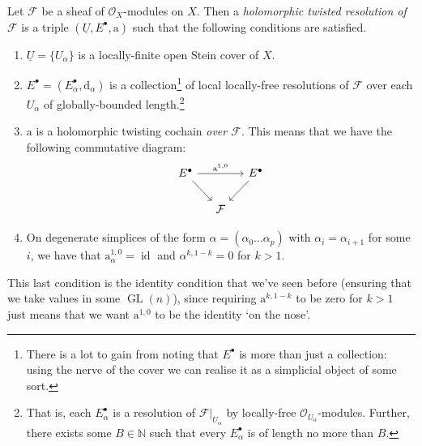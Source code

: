 \documentclass[11pt,notitlepage]{article}
\numberwithin{equation}{subsection}
\DeclareMathOperator{\GL}{GL}
\DeclareMathOperator{\id}{id}
\renewcommand{\d}{\mathrm{d}}
\begin{document}
                \begin{definition}
                    Let $\mathcal{F}$ be a sheaf of $\mathcal{O}_X$-modules on $X$.
                    Then a \textit{holomorphic twisted resolution of $\mathcal{F}$} is a triple $(\underline{U},E^\bullet,\mathrm{a})$ such that the following conditions are satisfied.
                    \begin{enumerate}
                        \item $\underline{U}=\{U_\alpha\}$ is a locally-finite open Stein cover of $X$.
                        \item $E^\bullet=(E^\bullet_\alpha,\d_\alpha)$ is a collection\footnote{There is a lot to gain from noting that $E^\bullet$ is more than just a collection: using the nerve of the cover we can realise it as a simplicial object of some sort.} of local locally-free resolutions of $\mathcal{F}$ over each $U_\alpha$ of globally-bounded length.\footnote{That is, each $E^\bullet_\alpha$ is a resolution of $\mathcal{F}|_{U_\alpha}$ by locally-free $\mathcal{O}_{U_\alpha}$-modules. Further, there exists some $B\in\mathbb{N}$ such that every $E^\bullet_\alpha$ is of length no more than $B$.}
                        \item $\mathrm{a}$ is a holomorphic twisting cochain \textit{over $\mathcal{F}$}.
                            This means that we have the following commutative diagram:
                            \begin{equation*}
                                \begin{tikzcd}[column sep=small]
                                    E^\bullet
                                        \ar{rr}{\mathrm{a}^{1,0}}
                                        \ar{dr}
                                    &
                                    &E^\bullet
                                        \ar{dl}\\
                                    &\mathcal{F}&
                                \end{tikzcd}
                            \end{equation*}
                        \item On degenerate simplices of the form $\alpha=(\alpha_0\ldots\alpha_p)$ with $\alpha_i=\alpha_{i+1}$ for some $i$, we have that $\mathrm{a}^{1,0}_\alpha=\id$ and $\alpha^{k,1-k}=0$ for $k>1$.\qedhere
                    \end{enumerate}
                \end{definition}
                This last condition is the identity condition that we've seen before (ensuring that we take values in some $\GL(n)$), since requiring $\mathrm{a}^{k,1-k}$ to be zero for $k>1$ just means that we want $\mathrm{a}^{1,0}$ to be the identity `on the nose'.
\end{document}
